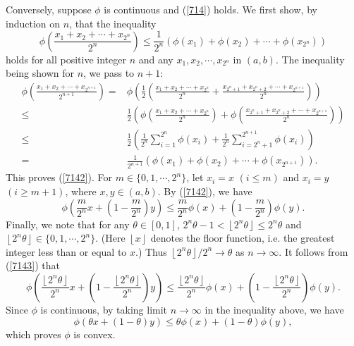 \begin{exercise}{7.14}
	Conversely, suppose $\phi$ is continuous and (\ref{714}) holds. We first show, by induction on $n$, that the inequality 
	\begin{equation}\label{7142}
		\phi\left(\frac{x_1+x_2+\cdots+x_{2^n}}{2^n}\right)\leq \frac{1}{2^n}\left(\phi(x_1)+\phi(x_2)+\cdots+\phi(x_{2^n})\right)
	\end{equation}
	holds for all positive integer $n$ and any $x_1, x_2,\cdots, x_{2^n}$ in $(a,b)$. The inequality being shown for $n$, we pass to $n+1$: 
	\begin{equation*}
		\begin{aligned}
		\phi\left(\frac{x_1+x_2+\cdots+x_{2^{n+1}}}{2^{n+1}}\right)=&	\phi\left(\frac{1}{2}\left(\frac{x_1+x_2+\cdots+x_{2^{n}}}{2^{n}}+\frac{x_{2^{n}+1}+x_{2^{n}+2}+\cdots+x_{2^{n+1}}}{2^{n}}\right)\right)\\
	\leq&\frac{1}{2}\left(\phi\left(\frac{x_1+x_2+\cdots+x_{2^n}}{2^n}\right)+	\phi\left(\frac{x_{2^{n}+1}+x_{2^{n}+2}+\cdots+x_{2^{n+1}}}{2^n}\right)\right)\\
	\leq&\frac{1}{2}\left(\frac{1}{2^n}\sum_{i=1}^{2^n}\phi(x_i)+\frac{1}{2^n}\sum_{i={2^n+1}}^{2^{n+1}}\phi(x_i)\right)\\
	=&\frac{1}{2^{n+1}}\left(\phi(x_1)+\phi(x_2)+\cdots+\phi(x_{2^{n+1}})\right).
		\end{aligned}
	\end{equation*}
	This proves (\ref{7142}). For $m\in\{0,1,\cdots,2^n\}$, let $x_i=x$ $( i\leq m)$ and $x_i=y$ $( i\geq m+1)$, where $x,y\in(a,b)$. By (\ref{7142}), we have
	\begin{equation}\label{7143}
	\phi\left(\frac{m}{2^n}x+(1-\frac{m}{2^n})y\right)\leq\frac{m}{2^n}\phi\left(x\right)+\left(1-\frac{m}{2^n}\right)\phi(y).
	\end{equation} 
	Finally, we note that for any $\theta\in[0,1]$,
	$2^n\theta-1<{\left\lfloor 2^{n} \theta\right\rfloor}\leq2^n\theta$ and $\left\lfloor 2^{n} \theta\right\rfloor\in\{0,1,\cdots,2^n\}$. (Here $\left\lfloor x\right\rfloor$ denotes the floor function, i.e. the greatest integer less than or equal to $x$.) Thus $\left\lfloor 2^{n} \theta\right\rfloor/2^n\to\theta$ as $n\to\infty$.
It follows from (\ref{7143}) that
$$\phi\left(\frac{\left\lfloor 2^{n} \theta\right\rfloor}{2^n}x+(1-\frac{\left\lfloor 2^{n} \theta\right\rfloor}{2^n})y\right)\leq\frac{\left\lfloor 2^{n} \theta\right\rfloor}{2^n}\phi\left(x\right)+\left(1-\frac{\left\lfloor 2^{n} \theta\right\rfloor}{2^n}\right)\phi(y).$$
Since $\phi$ is continuous, by taking limit $n\to\infty$ in the inequality above, we have  
	\begin{equation*}
	\phi(\theta x+(1-\theta)y)\leq \theta \phi(x)+(1-\theta)\phi(y),
	\end{equation*}
which proves $\phi$ is convex.
\end{exercise}
